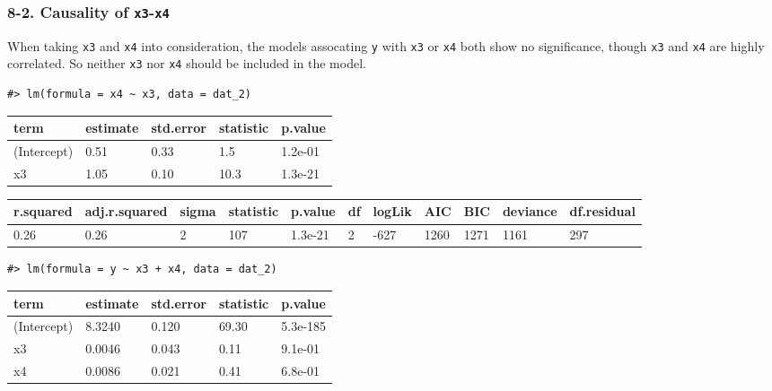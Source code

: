 \documentclass[main.tex]{subfiles}
\begin{document}
\hypertarget{causality-of-x3-x4}{%
\subsubsection{\texorpdfstring{8-2. Causality of
\texttt{x3}-\texttt{x4}}{8-2. Causality of x3-x4}}\label{causality-of-x3-x4}}

When taking \texttt{x3} and \texttt{x4} into consideration, the models
assocating \texttt{y} with \texttt{x3} or \texttt{x4} both show no
significance, though \texttt{x3} and \texttt{x4} are highly correlated.
So neither \texttt{x3} nor \texttt{x4} should be included in the model.

\begin{verbatim}
#> lm(formula = x4 ~ x3, data = dat_2)
\end{verbatim}

\begin{table}[H]
\centering
\begin{tabular}{lllll}
\toprule
term & estimate & std.error & statistic & p.value\\
\midrule
(Intercept) & 0.51 & 0.33 & 1.5 & 1.2e-01\\
x3 & 1.05 & 0.10 & 10.3 & 1.3e-21\\
\bottomrule
\end{tabular}
\end{table}

\begin{table}[H]
\centering
\begin{tabular}{lllllllllll}
\toprule
r.squared & adj.r.squared & sigma & statistic & p.value & df & logLik & AIC & BIC & deviance & df.residual\\
\midrule
0.26 & 0.26 & 2 & 107 & 1.3e-21 & 2 & -627 & 1260 & 1271 & 1161 & 297\\
\bottomrule
\end{tabular}
\end{table}

\begin{verbatim}
#> lm(formula = y ~ x3 + x4, data = dat_2)
\end{verbatim}

\begin{table}[H]
\centering
\begin{tabular}{lllll}
\toprule
term & estimate & std.error & statistic & p.value\\
\midrule
(Intercept) & 8.3240 & 0.120 & 69.30 & 5.3e-185\\
x3 & 0.0046 & 0.043 & 0.11 & 9.1e-01\\
x4 & 0.0086 & 0.021 & 0.41 & 6.8e-01\\
\bottomrule
\end{tabular}
\end{table}
\end{document}
